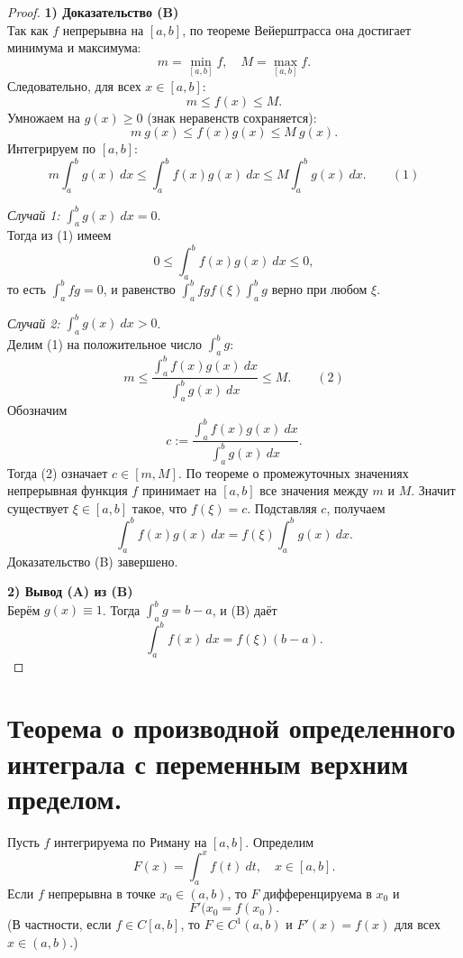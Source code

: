 \documentclass[14pt]{extreport}
\begin{document}
    \begin{proof}
        \textbf{1) Доказательство (B)}\\
        Так как $f$ непрерывна на $[a,b]$, по теореме Вейерштрасса она достигает минимума и максимума:
        \[
        m = \min_{[a,b]} f, \quad M = \max_{[a,b]} f.
        \]
        Следовательно, для всех $x \in [a,b]$:
        \[
        m \leq f(x) \leq M.
        \]
        Умножаем на $g(x) \geq 0$ (знак неравенств сохраняется):
        \[
        m\ g(x) \leq f(x) g(x) \leq M\ g(x).
        \]
        Интегрируем по $[a,b]$:
        \[
        m \int_a^b g(x)\ dx \leq \int_a^b f(x) g(x)\ dx \leq M \int_a^b g(x)\ dx. \qquad (1)
        \]
        
        \textit{Случай 1:} $\int_a^b g(x)\ dx = 0$.\\
        Тогда из (1) имеем
        \[
        0 \leq \int_a^b f(x) g(x)\ dx \leq 0,
        \]
        то есть $\int_a^b fg = 0$, и равенство $\int_a^b fg f(\xi) \int_a^b g$ верно при любом $\xi$.

        \textit{Случай 2:} $\int_a^b g(x)\ dx > 0$.\\
        Делим (1) на положительное число $\int_a^b g$:
        \[
        m \leq \frac{\int_a^b f(x) g(x)\ dx}{\int_a^b g(x)\ dx} \leq M. \qquad (2)
        \]
        Обозначим
        \[
        c := \frac{\int_a^b f(x) g(x)\ dx}{\int_a^b g(x)\ dx}.
        \]
        Тогда (2) означает $c \in [m,M]$. По теореме о промежуточных значениях непрерывная функция $f$ принимает на $[a,b]$ все значения между $m$ и $M$. Значит существует $\xi \in [a,b]$ такое, что $f(\xi) = c$. Подставляя $c$, получаем
        \[
        \int_a^b f(x) g(x)\ dx = f(\xi) \int_a^b g(x)\ dx.
        \]
        Доказательство (B) завершено.

        \textbf{2) Вывод (A) из (B)}\\
        Берём $g(x) \equiv 1$. Тогда $\int_a^b g = b-a$, и (B) даёт
        \[
        \int_a^b f(x)\ dx = f(\xi) (b-a).
        \]
    \end{proof}



    \chapter{Теорема о производной определенного интеграла с переменным верхним пределом.}

    \begin{theorem}
        Пусть $f$ интегрируема по Риману на $[a,b]$. Определим
        \[
        F(x) = \int_a^x f(t)\ dt, \quad x \in [a,b].
        \]
        Если $f$ непрерывна в точке $x_0 \in (a,b)$, то $F$ дифференцируема в $x_0$ и
        \[
        F'(x_0 = f(x_0).
        \]
        (В частности, если $f \in C[a,b]$, то $F \in C^1(a,b)$ и $F'(x) = f(x)$ для всех $x \in (a,b)$.)
    \end{theorem}
\end{document}
